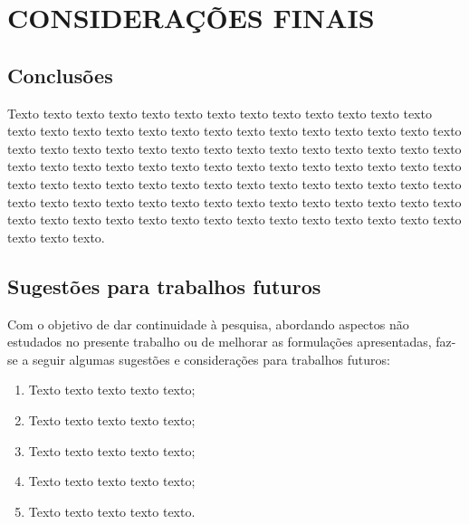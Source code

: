 \chapter{CONSIDERAÇÕES FINAIS}\noindent \label{cap:conclusões}


\section{Conclusões}

Texto texto texto texto texto texto texto texto texto texto texto texto texto texto texto texto texto texto texto texto texto texto texto texto texto texto texto texto texto texto texto texto texto texto texto texto texto texto texto texto texto texto texto texto texto texto texto texto texto texto texto texto texto texto texto texto texto texto texto texto texto texto texto texto texto texto texto texto texto texto texto texto texto texto texto texto texto texto texto texto texto texto texto texto texto texto texto texto texto texto texto texto texto texto texto texto texto texto texto texto.

\section{Sugestões para trabalhos futuros}

Com o objetivo de dar continuidade à pesquisa, abordando aspectos não estudados no presente trabalho ou de melhorar as formulações apresentadas, faz-se a seguir algumas sugestões e considerações para trabalhos futuros:



\begin{enumerate} [label=\alph*)]
\item Texto texto texto texto texto;
\item Texto texto texto texto texto;
\item Texto texto texto texto texto;
\item Texto texto texto texto texto;
\item Texto texto texto texto texto.
\end{enumerate}
